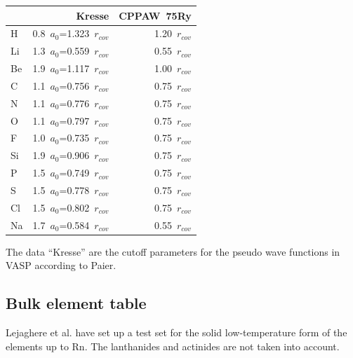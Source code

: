 \documentclass[11pt,a4paper]{report}
\begin{document}
\begin{center}
\begin{tabular}{|l|r|r|}
\hline
& Kresse  & CPPAW~75Ry\\
\hline
H  & 0.8~$a_0$=1.323~$r_{cov}$ & 1.20~$r_{cov}$ \\
Li & 1.3~$a_0$=0.559~$r_{cov}$ & 0.55~$r_{cov}$ \\
Be & 1.9~$a_0$=1.117~$r_{cov}$ & 1.00~$r_{cov}$ \\
C  & 1.1~$a_0$=0.756~$r_{cov}$ & 0.75~$r_{cov}$ \\
N  & 1.1~$a_0$=0.776~$r_{cov}$ & 0.75~$r_{cov}$ \\
O  & 1.1~$a_0$=0.797~$r_{cov}$ & 0.75~$r_{cov}$ \\
F  & 1.0~$a_0$=0.735~$r_{cov}$ & 0.75~$r_{cov}$ \\
Si & 1.9~$a_0$=0.906~$r_{cov}$ & 0.75~$r_{cov}$ \\
P  & 1.5~$a_0$=0.749~$r_{cov}$ & 0.75~$r_{cov}$ \\
S  & 1.5~$a_0$=0.778~$r_{cov}$ & 0.75~$r_{cov}$ \\
Cl & 1.5~$a_0$=0.802~$r_{cov}$ & 0.75~$r_{cov}$ \\
Na & 1.7~$a_0$=0.584~$r_{cov}$ & 0.55~$r_{cov}$ \\
\hline
\end{tabular}
\end{center}
The data ``Kresse'' are the cutoff parameters for the pseudo wave
functions in VASP according to Paier\cite{paier05_jcp122_234102}.

\subsection{Bulk element table}
Lejaghere et al.\cite{lejaeghere14_critrevsolstmatsci39_1} have set up
a test set for the solid low-temperature form of the elements up to
Rn. The lanthanides and actinides are not taken into account.
\end{document}
